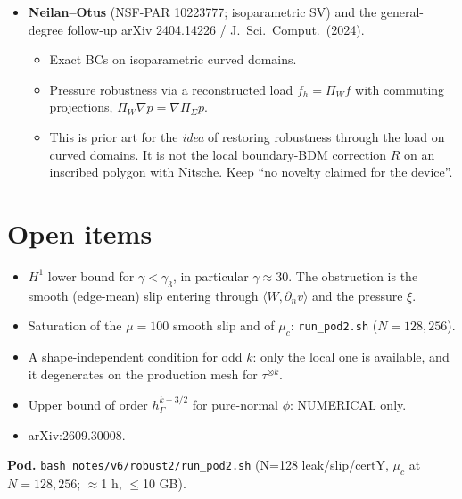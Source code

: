\documentclass[11pt]{article}
\theoremstyle{remark}
\newcommand{\hG}{h_\Gamma}
\newcommand{\ip}[2]{\langle #1,#2\rangle}
\begin{document}
\begin{itemize}
\item \textbf{Neilan--Otus} (NSF-PAR 10223777; isoparametric SV) and the general-degree follow-up arXiv 2404.14226 /
J.\ Sci.\ Comput.\ (2024).
\begin{itemize}
\item Exact BCs on isoparametric curved domains.
\item Pressure robustness via a reconstructed load $f_h=\Pi_Wf$ with commuting projections, $\Pi_W\nabla p=\nabla\Pi_\Sigma p$.
\item This is prior art for the \emph{idea} of restoring robustness through the load on curved domains. It is not the
local boundary-BDM correction $R$ on an inscribed polygon with Nitsche. Keep ``no novelty claimed for the device''.
\end{itemize}
\end{itemize}

\section{Open items}
\begin{itemize}
\item $H^1$ lower bound for $\gamma<\gamma_3$, in particular $\gamma\approx30$. The obstruction is the smooth (edge-mean) slip
entering through $\ip{W}{\partial_nv}$ and the pressure $\xi$.
\item Saturation of the $\mu=100$ smooth slip and of $\mu_c$: \texttt{run\_pod2.sh} ($N=128,256$).
\item A shape-independent condition for odd $k$: only the local one is available, and it degenerates on the production
mesh for $\tau^{\otimes k}$.
\item Upper bound of order $\hG^{k+3/2}$ for pure-normal $\phi$: NUMERICAL only.
\item arXiv:2609.30008.
\end{itemize}

\noindent\textbf{Pod.} \texttt{bash notes/v6/robust2/run\_pod2.sh} (N=128 leak/slip/certY, $\mu_c$ at $N=128,256$;
$\approx$1 h, $\le$10 GB).
\end{document}
